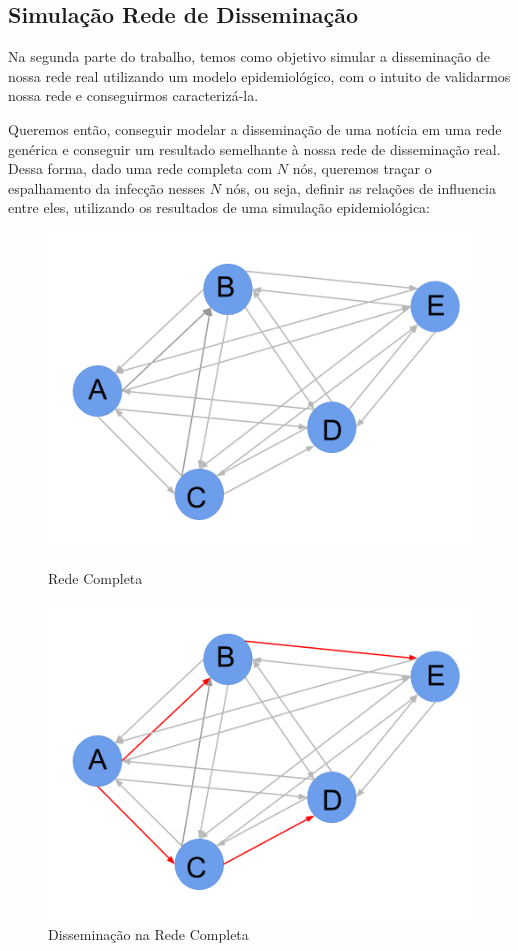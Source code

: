 \documentclass[a4paper,12pt]{article}
\begin{document}
\subsection{Simulação Rede de Disseminação}

Na segunda parte do trabalho, temos como objetivo simular a disseminação de nossa rede real utilizando um modelo epidemiológico, com o intuito
de validarmos nossa rede e conseguirmos caracterizá-la.

Queremos então, conseguir modelar a disseminação de uma notícia em uma rede genérica e conseguir um resultado semelhante à nossa rede de
disseminação real. Dessa forma, dado uma rede completa com $N$ nós, queremos traçar o espalhamento da infecção nesses $N$ nós, ou seja, definir
as relações de influencia entre eles, utilizando os resultados de uma simulação epidemiológica:
\vspace{0.4cm}

\begin{figure}[ht]
\centering
\begin{minipage}{.5\textwidth}
  \centering
  \includegraphics[width=.9\linewidth]{./rede3.png}
  \caption{Rede Completa}
  \label{fig:test1}
\end{minipage}%
\begin{minipage}{.5\textwidth}
  \centering
  \includegraphics[width=.9\linewidth]{./rede4.png}
  \caption{Disseminação na Rede Completa}
  \label{fig:test2}
\end{minipage}
\end{figure}
\end{document}
